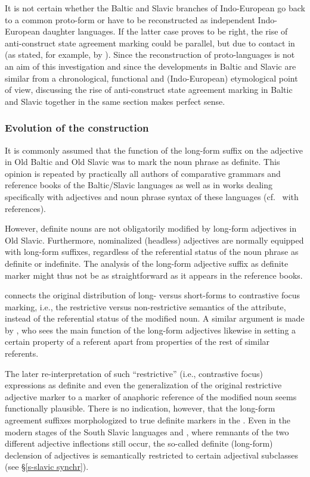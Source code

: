 It is not certain whether the Baltic and Slavic branches of Indo-European go back to a common proto-form or  have to be reconstructed as independent Indo-European daughter languages. If the latter case proves to be right, the rise of anti\hyp{}construct state agreement marking could be parallel, but due to contact in  (as stated, for example, by \citealt[77]{pohl1980}). Since the reconstruction of proto-languages is not an aim of this investigation and since the developments in Baltic and Slavic are similar from a chronological, functional and (Indo-European) etymological point of view, discussing the rise of anti\hyp{}construct state agreement marking in Baltic and Slavic together in the same section makes perfect sense.

\subsubsection{Evolution of the construction} 
It is commonly assumed that the function of the long-form suffix on the adjective in Old Baltic and Old Slavic was to mark the noun phrase as definite. This opinion is repeated by practically all authors of comparative grammars and reference books of the Baltic\slash{}Slavic languages as well as in works dealing specifically with adjectives and noun phrase syntax of these languages (cf.~\citealt[211]{mendoza2004} with references).

However, definite nouns are not obligatorily modified by long-form adjectives in Old Slavic. Furthermore, nominalized (headless) adjectives are normally equipped with long-form suffixes, regardless of the referential status of the noun phrase as definite or indefinite. The analysis of the long-form adjective suffix as definite marker might thus not be as straightforward as it appears in the reference books. 

\citet[214–215]{mendoza2004} connects the original distribution of long- versus short-forms to contrastive focus marking, i.e., the restrictive versus non\hyp{}restrictive semantics of the attribute, instead of the referential status of the modified noun. A similar argument is made by \citet{tolstoj1957}, who sees the main function of the long-form adjectives likewise in setting a certain property of a referent apart from properties of the rest of similar referents. 

The later re-interpretation of such “restrictive” (i.e., contrastive focus) expressions as definite and even the generalization of the original restrictive adjective marker to a marker of anaphoric reference of the modified noun seems functionally plausible. There is no indication, however, that the long-form agreement suffixes morphologized to true definite markers in the . Even in the modern stages of the South Slavic languages  and , where remnants of the two different adjective inflections still occur, the so-called definite (long-form) declension of adjectives is semantically restricted to certain adjectival subclasses (see \S\ref{s-slavic synchr}).

